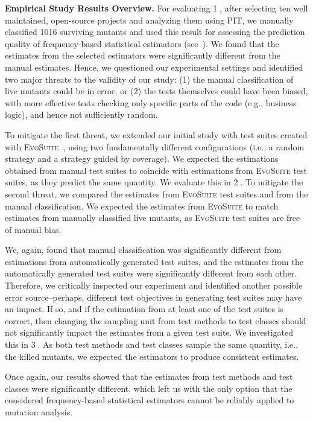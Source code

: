 \documentclass[sigconf]{acmart}
\newcommand{\projectCount}{ten\xspace}
\newcommand{\Evosuite}{\textsc{EvoSuite}\xspace}
\newcommand{\PIT}{\textsc{PIT}\xspace}
\newcommand{\RQA}{\textcircled{1}\xspace}
\newcommand{\RQB}{\textcircled{2}\xspace}
\newcommand{\RQC}{\textcircled{3}\xspace}
\begin{document}
\textbf{Empirical Study Results Overview.}
For evaluating \RQA, after selecting \projectCount well maintained,
open-source projects and analyzing them
using \PIT, we manually classified 1016 surviving mutants
and used this result for assessing the prediction quality of
frequency-based statistical estimators (see~).
We found that
the estimates from the selected estimators
were significantly different from the manual estimates.
Hence, we questioned our experimental settings
and identified two major threats to the validity of our study:
(1) the manual classification of live mutants could be in error, or
(2) the tests themselves could have been biased, with more effective tests checking
only specific parts of the code (e.g., business logic), and hence
not sufficiently random.

To mitigate the first threat, we extended our initial study with test suites created with
\Evosuite~\cite{fraser2011evosuite},
using two fundamentally different configurations (i.e., a random strategy and a strategy guided by coverage).
We expected the estimations obtained from manual test suites
to coincide with estimations from \Evosuite test suites,
as they predict the same quantity.
We evaluate this in \RQB.
To mitigate the second threat, we compared the estimates from \Evosuite
test suites and from the manual classification. We expected
the estimates from \Evosuite to match estimates from manually classified live
mutants, as \Evosuite test suites are free of manual bias. %

We, again, found that manual classification was significantly different from
estimations from automatically generated test suites, and the estimates from the automatically
generated test suites %
were significantly different from each other.
Therefore, we critically inspected our experiment and identified another
possible error source--perhaps, different test objectives
in generating test suites may have an impact.
If so, and if the estimation from at least one of the test
suites is correct, then changing the sampling unit from test methods to test
classes should not significantly impact the estimates from a given test suite.
We investigated this in \RQC.
As both test methods and test classes sample the same quantity, i.e., the killed mutants,
we expected the estimators to produce consistent estimates.

Once again, our results showed that the estimates from test methods and test classes were
significantly different, which left us with the only option that the considered frequency-based statistical
estimators cannot be reliably applied to mutation analysis.
\end{document}
